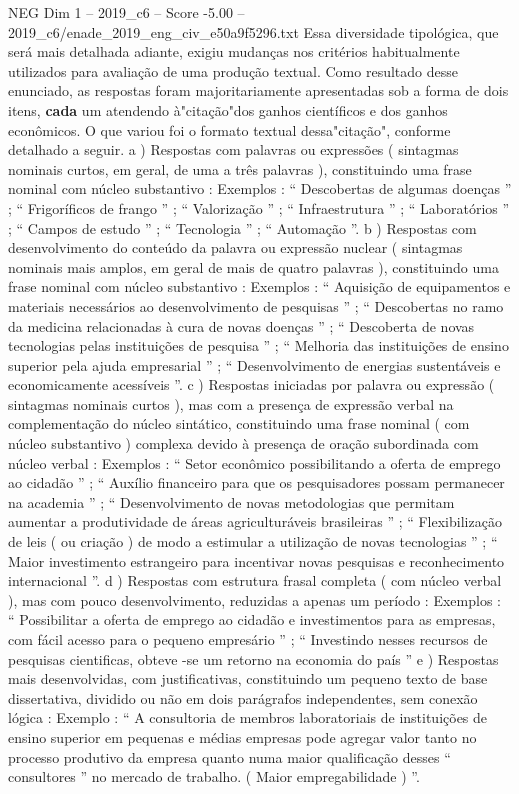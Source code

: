\begin{textsample}{NEG Dim 1 – 2019\_c6 – Score -5.00 – 2019\_c6/enade\_2019\_eng\_civ\_e50a9f5296.txt}
Essa diversidade tipológica, que será mais detalhada adiante, exigiu mudanças nos critérios habitualmente utilizados para avaliação de uma produção textual.
Como resultado desse enunciado, as respostas foram majoritariamente apresentadas sob a forma de dois itens, \textbf{cada} um atendendo à"citação"dos ganhos científicos e dos ganhos econômicos.
O que variou foi o formato textual dessa"citação", conforme detalhado a seguir. a ) Respostas com palavras ou expressões ( sintagmas nominais curtos, em geral, de uma a três palavras ), constituindo uma frase nominal com núcleo substantivo : Exemplos : “ Descobertas de algumas doenças ” ; “ Frigoríficos de frango ” ; “ Valorização ” ; “ Infraestrutura ” ; “ Laboratórios ” ; “ Campos de estudo ” ; “ Tecnologia ” ; “ Automação ”. b ) Respostas com desenvolvimento do conteúdo da palavra ou expressão nuclear ( sintagmas nominais mais amplos, em geral de mais de quatro palavras ), constituindo uma frase nominal com núcleo substantivo : Exemplos : “ Aquisição de equipamentos e materiais necessários ao desenvolvimento de pesquisas ” ; “ Descobertas no ramo da medicina relacionadas à cura de novas doenças ” ; “ Descoberta de novas tecnologias pelas instituições de pesquisa ” ; “ Melhoria das instituições de ensino superior pela ajuda empresarial ” ; “ Desenvolvimento de energias sustentáveis e economicamente acessíveis ”. c ) Respostas iniciadas por palavra ou expressão ( sintagmas nominais curtos ), mas com a presença de expressão verbal na complementação do núcleo sintático, constituindo uma frase nominal ( com núcleo substantivo ) complexa devido à presença de oração subordinada com núcleo verbal : Exemplos : “ Setor econômico possibilitando a oferta de emprego ao cidadão ” ; “ Auxílio financeiro para que os pesquisadores possam permanecer na academia ” ; “ Desenvolvimento de novas metodologias que permitam aumentar a produtividade de áreas agriculturáveis brasileiras ” ; “ Flexibilização de leis ( ou criação ) de modo a estimular a utilização de novas tecnologias ” ; “ Maior investimento estrangeiro para incentivar novas pesquisas e reconhecimento internacional ”. d ) Respostas com estrutura frasal completa ( com núcleo verbal ), mas com pouco desenvolvimento, reduzidas a apenas um período : Exemplos : “ Possibilitar a oferta de emprego ao cidadão e investimentos para as empresas, com fácil acesso para o pequeno empresário ” ; “ Investindo nesses recursos de pesquisas cientificas, obteve -se um retorno na economia do país ” e ) Respostas mais desenvolvidas, com justificativas, constituindo um pequeno texto de base dissertativa, dividido ou não em dois parágrafos independentes, sem conexão lógica : Exemplo : “ A consultoria de membros laboratoriais de instituições de ensino superior em pequenas e médias empresas pode agregar valor tanto no processo produtivo da empresa quanto numa maior qualificação desses “ consultores ” no mercado de trabalho. ( Maior empregabilidade ) ”.

\end{textsample}

